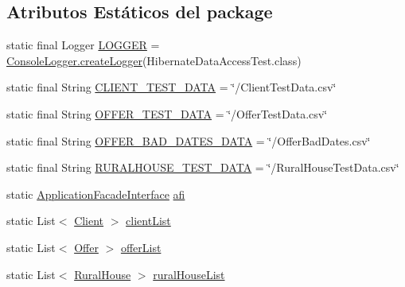 \subsection*{Atributos Estáticos del \textquotesingle{}package\textquotesingle{}}
\begin{DoxyCompactItemize}
\item 
static final Logger \mbox{\hyperlink{a00272_a9eb49660cab06be45dd2c75727b59ed3}{L\+O\+G\+G\+ER}} = \mbox{\hyperlink{a00220_a520321643663e37d95761134a35505cd}{Console\+Logger.\+create\+Logger}}(Hibernate\+Data\+Access\+Test.\+class)
\item 
static final String \mbox{\hyperlink{a00272_ae42994f5a5d8bf916a38b64cda2788b1}{C\+L\+I\+E\+N\+T\+\_\+\+T\+E\+S\+T\+\_\+\+D\+A\+TA}} = \char`\"{}/Client\+Test\+Data.\+csv\char`\"{}
\item 
static final String \mbox{\hyperlink{a00272_a59951fd66def285f9ae4e140ee9eb8be}{O\+F\+F\+E\+R\+\_\+\+T\+E\+S\+T\+\_\+\+D\+A\+TA}} = \char`\"{}/Offer\+Test\+Data.\+csv\char`\"{}
\item 
static final String \mbox{\hyperlink{a00272_a8fbef10c94c800b06db31a91c4be95bf}{O\+F\+F\+E\+R\+\_\+\+B\+A\+D\+\_\+\+D\+A\+T\+E\+S\+\_\+\+D\+A\+TA}} = \char`\"{}/Offer\+Bad\+Dates.\+csv\char`\"{}
\item 
static final String \mbox{\hyperlink{a00272_a9f9d6116edd1cdeb60cf726a921d148f}{R\+U\+R\+A\+L\+H\+O\+U\+S\+E\+\_\+\+T\+E\+S\+T\+\_\+\+D\+A\+TA}} = \char`\"{}/Rural\+House\+Test\+Data.\+csv\char`\"{}
\item 
static \mbox{\hyperlink{a00136}{Application\+Facade\+Interface}} \mbox{\hyperlink{a00272_a80a8ded7f2e12687541427d97fdbe29a}{afi}}
\item 
static List$<$ \mbox{\hyperlink{a00164}{Client}} $>$ \mbox{\hyperlink{a00272_a9c323e2ca2ed9c802bff65a3a10d88f5}{client\+List}}
\item 
static List$<$ \mbox{\hyperlink{a00184}{Offer}} $>$ \mbox{\hyperlink{a00272_a75c40ab88ced6c053e2067b1515c18b9}{offer\+List}}
\item 
static List$<$ \mbox{\hyperlink{a00188}{Rural\+House}} $>$ \mbox{\hyperlink{a00272_a989d035f20b8a64527db2fbbd411943e}{rural\+House\+List}}
\end{DoxyCompactItemize}

